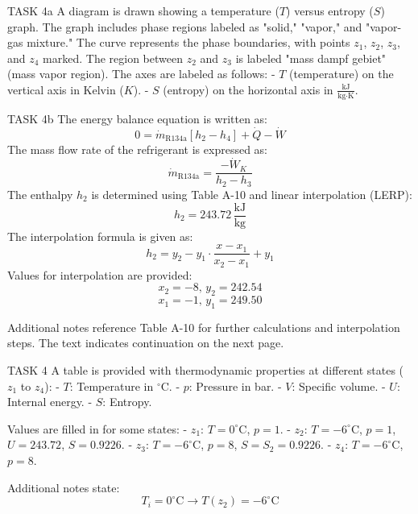 TASK 4a  
A diagram is drawn showing a temperature (\( T \)) versus entropy (\( S \)) graph. The graph includes phase regions labeled as "solid," "vapor," and "vapor-gas mixture." The curve represents the phase boundaries, with points \( z_1 \), \( z_2 \), \( z_3 \), and \( z_4 \) marked. The region between \( z_2 \) and \( z_3 \) is labeled "mass dampf gebiet" (mass vapor region). The axes are labeled as follows:  
- \( T \) (temperature) on the vertical axis in Kelvin (\( K \)).  
- \( S \) (entropy) on the horizontal axis in \( \frac{\text{kJ}}{\text{kg·K}} \).  

TASK 4b  
The energy balance equation is written as:  
\[
0 = \dot{m}_{\text{R134a}} \left[ h_2 - h_4 \right] + \dot{Q} - \dot{W}
\]  
The mass flow rate of the refrigerant is expressed as:  
\[
\dot{m}_{\text{R134a}} = \frac{-\dot{W}_K}{h_2 - h_3}
\]  
The enthalpy \( h_2 \) is determined using Table A-10 and linear interpolation (LERP):  
\[
h_2 = 243.72 \, \frac{\text{kJ}}{\text{kg}}
\]  
The interpolation formula is given as:  
\[
h_2 = y_2 - y_1 \cdot \frac{x - x_1}{x_2 - x_1} + y_1
\]  
Values for interpolation are provided:  
\[
x_2 = -8, \, y_2 = 242.54  
\]  
\[
x_1 = -1, \, y_1 = 249.50  
\]  

Additional notes reference Table A-10 for further calculations and interpolation steps. The text indicates continuation on the next page.  

TASK 4  
A table is provided with thermodynamic properties at different states (\( z_1 \) to \( z_4 \)):  
- \( T \): Temperature in \( ^\circ \text{C} \).  
- \( p \): Pressure in bar.  
- \( V \): Specific volume.  
- \( U \): Internal energy.  
- \( S \): Entropy.  

Values are filled in for some states:  
- \( z_1 \): \( T = 0^\circ \text{C} \), \( p = 1 \).  
- \( z_2 \): \( T = -6^\circ \text{C} \), \( p = 1 \), \( U = 243.72 \), \( S = 0.9226 \).  
- \( z_3 \): \( T = -6^\circ \text{C} \), \( p = 8 \), \( S = S_2 = 0.9226 \).  
- \( z_4 \): \( T = -6^\circ \text{C} \), \( p = 8 \).  

Additional notes state:  
\[
T_i = 0^\circ \text{C} \rightarrow T(z_2) = -6^\circ \text{C}
\]